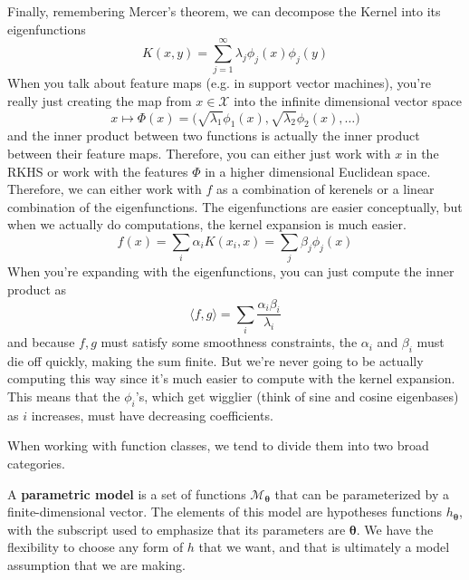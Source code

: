   Finally, remembering Mercer's theorem, we can decompose the Kernel into its eigenfunctions 
  \begin{equation}
    K(x, y) = \sum_{j=1}^\infty \lambda_j \phi_j(x) \phi_j(y) 
  \end{equation}
  When you talk about feature maps (e.g. in support vector machines), you're really just creating the map from $x \in \mathcal{X}$ into the infinite dimensional vector space 
  \begin{equation}
    x \mapsto \Phi(x) = \big( \sqrt{\lambda_1} \phi_1(x), \sqrt{\lambda_2} \phi_2(x), \ldots \big)
  \end{equation}
  and the inner product between two functions is actually the inner product between their feature maps. Therefore, you can either just work with $x$ in the RKHS or work with the features $\Phi$ in a higher dimensional Euclidean space. Therefore, we can either work with $f$ as a combination of kerenels or a linear combination of the eigenfunctions. The eigenfunctions are easier conceptually, but when we actually do computations, the kernel expansion is much easier. 
  \begin{equation}
    f(x) = \sum_{i} \alpha_i K(x_i, x) = \sum_j \beta_j \phi_j(x) 
  \end{equation}
  When you're expanding with the eigenfunctions, you can just compute the inner product as 
  \begin{equation}
    \langle f, g \rangle = \sum_i \frac{\alpha_i \beta_i}{\lambda_i}
  \end{equation}
  and because $f, g$ must satisfy some smoothness constraints, the $\alpha_i$ and $\beta_i$ must die off quickly, making the sum finite. But we're never going to be actually computing this way since it's much easier to compute with the kernel expansion. This means that the $\phi_i$'s, which get wigglier (think of sine and cosine eigenbases) as $i$ increases, must have decreasing coefficients. 

  When working with function classes, we tend to divide them into two broad categories. 

  \begin{definition}
    A \textbf{parametric model} is a set of functions $\mathcal{M}_{\boldsymbol{\theta}}$ that can be parameterized by a finite-dimensional vector. The elements of this model are hypotheses functions $h_{\boldsymbol{\theta}}$, with the subscript used to emphasize that its parameters are $\boldsymbol{\theta}$. We have the flexibility to choose any form of $h$ that we want, and that is ultimately a model assumption that we are making. 
  \end{definition}

